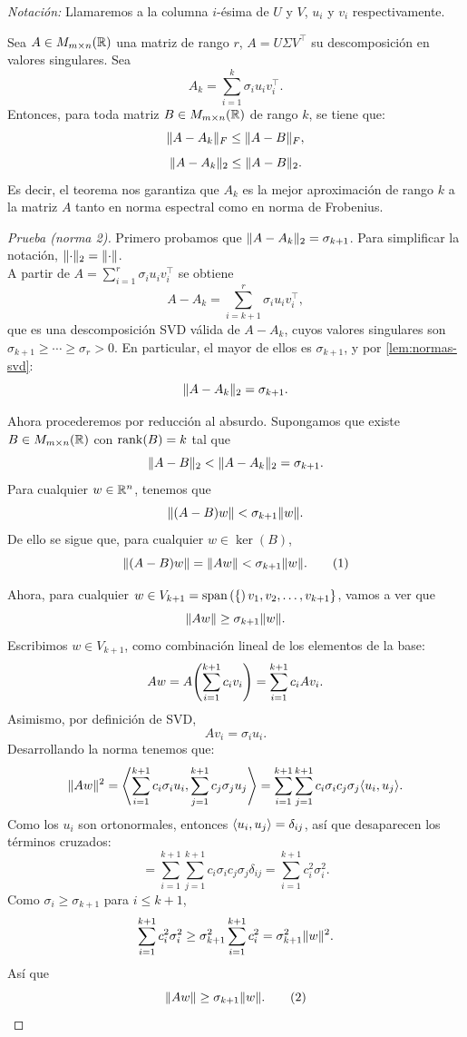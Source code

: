 \textit{Notación:} Llamaremos a la columna $i$-ésima de $U$ y $V$, $u_i$ y $v_i$ respectivamente.

\begin{theorem}\label{thm:eckart-young}
	Sea $A \in M_{m \times n}(\R)$ una matriz de rango $r$, $A = U \Sigma V^{\top}$ su descomposición en valores singulares. Sea \[ A_k = \sum_{i=1}^{k}\sigma_i u_i v_i^{\top}. \]
	Entonces, para toda matriz $B \in M_{m \times n}(\R)$ de rango $k$, se tiene que:
	\[ \norm{A-A_k}_F \leq \norm{A-B}_F, \]
	\[ \norm{A-A_k}_2 \leq \norm{A-B}_2. \]
	Es decir, el teorema nos garantiza que $A_k$ es la mejor aproximación de rango $k$ a la matriz $A$ tanto en norma espectral como en norma de Frobenius.
\end{theorem}

\begin{proof}[Prueba (norma 2)]
	Primero probamos que $\norm{A - A_k}_2 = \sigma_{k+1}$. Para simplificar la notación, $\norm{\cdot}_2 = \norm{\cdot}$.\\

	A partir de $A = \sum_{i=1}^{r} \sigma_i u_i v_i^{\top}$ se obtiene
	\[
		A - A_k = \sum_{i=k+1}^{r} \sigma_i u_i v_i^{\top},
	\]
	que es una descomposición SVD válida de $A - A_k$, cuyos valores singulares son $\sigma_{k+1} \geq \cdots \geq \sigma_r > 0$. En particular, el mayor de ellos es $\sigma_{k+1}$, y por \cref{lem:normas-svd}:
	\[
		\norm{A - A_k}_2 = \sigma_{k+1}.
	\]

	Ahora procederemos por reducción al absurdo. Supongamos que existe $B \in M_{m \times n}(\R)$ con $\rk(B) = k$ tal que
	\[
		\norm{A - B}_2 < \norm{A - A_k}_2 = \sigma_{k+1}.
	\]
	Para cualquier $w \in \R^n$, tenemos que
	\[
		\norm{(A - B)w} < \sigma_{k+1}\norm{w}.
	\]
	De ello se sigue que, para cualquier $w \in \ker(B)$,
	\[
		\norm{(A - B)w} = \norm{Aw} < \sigma_{k+1}\norm{w}. \tag{1}
	\]

	Ahora, para cualquier $w \in V_{k+1} = \spn\{v_1, v_2, \ldots, v_{k+1}\}$, vamos a ver que
	\[
		\norm{Aw} \geq \sigma_{k+1}\norm{w}.
	\]
	Escribimos $w \in V_{k+1}$, como combinación lineal de los elementos de la base:
	\[ Aw
		= A\parens*{\sum_{i=1}^{k+1} c_i v_i}
		= \sum_{i=1}^{k+1} c_i A v_i. \]
	Asimismo, por definición de SVD,
	\[ A v_i = \sigma_i u_i. \]
	Desarrollando la norma tenemos que:
	\[ \norm{Aw}^2
		= \ip*{\sum_{i=1}^{k+1} c_i\sigma_i u_i,
			\sum_{j=1}^{k+1} c_j\sigma_j u_j}
		= \sum_{i=1}^{k+1}\sum_{j=1}^{k+1} c_i \sigma_i c_j \sigma_j \ip{u_i, u_j}. \]
	Como los $u_i$ son ortonormales, entonces $\ip{u_i, u_j} = \delta_{ij}$, así que desaparecen los términos cruzados:
	\[
		= \sum_{i=1}^{k+1}\sum_{j=1}^{k+1} c_i \sigma_i c_j \sigma_j \delta_{ij}
		= \sum_{i=1}^{k+1} c_i^2 \sigma_i^2.
	\]
	Como $\sigma_i \geq \sigma_{k+1}$ para $i \leq k+1$,
	\[ \sum_{i=1}^{k+1} c_i^2 \sigma_i^2
		\geq
		\sigma_{k+1}^2 \sum_{i=1}^{k+1} c_i^2
		=
		\sigma_{k+1}^2 \norm{w}^2. \]
	Así que
	\[
		\norm{Aw} \geq \sigma_{k+1}\norm{w}. \tag{2}
	\]


\end{proof}
